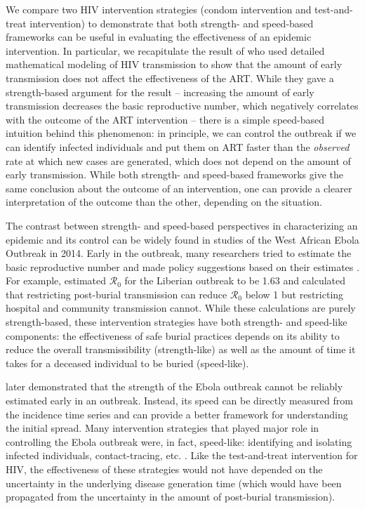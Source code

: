 \documentclass[12pt]{article}
\begin{document}
We compare two HIV intervention strategies (condom intervention and test-and-treat intervention) to demonstrate that both strength- and speed-based frameworks can be useful in evaluating the effectiveness of an epidemic intervention.
In particular, we recapitulate the result of \cite{eaton2014proportion} who used detailed mathematical modeling of HIV transmission to show that the amount of early transmission does not affect the effectiveness of the ART.
While they gave a strength-based argument for the result --  increasing the amount of early transmission decreases the basic reproductive number, which negatively correlates with the outcome of the ART intervention \citep{eaton2014proportion} -- there is a simple speed-based intuition behind this phenomenon: in principle, we can control the outbreak if we can identify infected individuals and put them on ART faster than the \emph{observed} rate at which new cases are generated, which does not depend on the amount of early transmission.
While both strength- and speed-based frameworks give the same conclusion about the outcome of an intervention, one can provide a clearer interpretation of the outcome than the other, depending on the situation.

The contrast between strength- and speed-based perspectives in characterizing an epidemic and its control can be widely found in studies of the West African Ebola Outbreak in 2014.
Early in the outbreak, many researchers tried to estimate the basic reproductive number and made policy suggestions based on their estimates \citep{althaus2014estimating, fisman2014early, gomes2014assessing, pandey2014strategies, shaman2014inference, towers2014temporal, who2014ebola}.
For example, \cite{pandey2014strategies} estimated $\mathcal R_0$ for the Liberian outbreak to be 1.63 and calculated that restricting post-burial transmission can reduce $\mathcal R_0$ below 1 but restricting hospital and community transmission cannot.
While these calculations are purely strength-based, these intervention strategies have both strength- and speed-like components: the effectiveness of safe burial practices depends on its ability to reduce the overall transmissibility (strength-like) as well as the amount of time it takes for a deceased individual to be buried (speed-like).

\cite{weitz2015modeling} later demonstrated that the strength of the Ebola outbreak cannot be reliably estimated early in an outbreak.
Instead, its speed can be directly measured from the incidence time series \citep{chowell2003sars, mills2004transmissibility, nishiura2009transmission, nishiura2010pros, ma2014estimating} and can provide a better framework for understanding the initial spread.
Many intervention strategies that played major role in controlling the Ebola outbreak were, in fact, speed-like: identifying and isolating infected individuals, contact-tracing, etc. \citep{pandey2014strategies}.
Like the test-and-treat intervention for HIV, the effectiveness of these strategies would not have depended on the uncertainty in the underlying disease generation time (which would have been propagated from the uncertainty in the amount of post-burial transmission).




\end{document}
